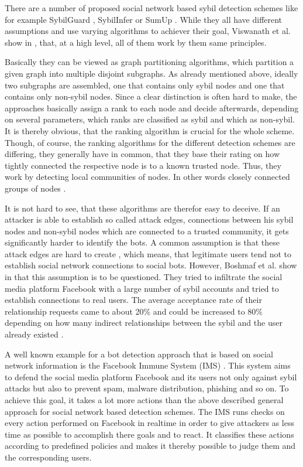 There are a number of proposed social network based sybil detection schemes like for example SybilGuard \cite{sybilguard}, SybilInfer \cite{sybilinfer} or SumUp \cite{sumup}. While they all have different assumptions and use varying algorithms to achiever their goal, Viswanath et al. show in \cite{comparison}, that, at a high level, all of them work by them same principles.

Basically they can be viewed as graph partitioning algorithms, which partition a given graph into multiple disjoint subgraphs. As already mentioned above, ideally two subgraphs are assembled, one that contains only sybil nodes and one that contains only non-sybil nodes. Since a clear distinction is often hard to make, the approaches basically assign a rank to each node and decide afterwards, depending on several parameters, which ranks are classified as sybil and which as non-sybil. It is thereby obvious, that the ranking algorithm is crucial for the whole scheme. Though, of course, the ranking algorithms for the different detection schemes are differing, they generally have in common, that they base their rating on how tightly connected the respective node is to a known trusted node. Thus, they work by detecting local communities of nodes. In other words closely connected groups of nodes \cite{comparison}.

It is not hard to see, that these algorithms are therefor easy to deceive. If an attacker is able to establish so called attack edges, connections between his sybil nodes and non-sybil nodes which are connected to a trusted community, it gets significantly harder to identify the bots. A common assumption is that these attack edges are hard to create \cite{sybilguard}, which means, that legitimate users tend not to establish social network connections to social bots. However, Boshmaf et al. show in \cite{boshmaf11} that this assumption is to be questioned. 
They tried to infiltrate the social media platform Facebook with a large number of sybil accounts and tried to establish connections to real users. The average acceptance rate of their relationship requests came to about 20\% and could be increased to 80\% depending on how many indirect relationships between the sybil and the user already existed \cite{boshmaf11}. %

A well known example for a bot detection approach that is based on social network information is the Facebook Immune System (IMS) \cite{fis}. This system aims to defend the social media platform Facebook and its users not only against sybil attacks but also to prevent spam, malware distribution, phishing and so on.  To achieve this goal, it takes a lot more actions than the above described general approach for social network based detection schemes. The IMS runs checks on every action performed on Facebook in realtime in order to give attackers as less time as possible to accomplish there goals and to react. It classifies these actions according to predefined policies and makes it thereby possible to judge them and the corresponding users.

